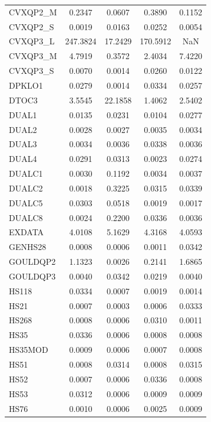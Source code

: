 \begin{longtable}{lcccc}
CVXQP2\_M &   0.2347 &   0.0607 &   0.3890 &   0.1152 \\
CVXQP2\_S &   0.0019 &   0.0163 &   0.0252 &   0.0054 \\
CVXQP3\_L & 247.3824 &  17.2429 & 170.5912 &      NaN \\
CVXQP3\_M &   4.7919 &   0.3572 &   2.4034 &   7.4220 \\
CVXQP3\_S &   0.0070 &   0.0014 &   0.0260 &   0.0122 \\
DPKLO1   &   0.0279 &   0.0014 &   0.0334 &   0.0257 \\
DTOC3    &   3.5545 &  22.1858 &   1.4062 &   2.5402 \\
DUAL1    &   0.0135 &   0.0231 &   0.0104 &   0.0277 \\
DUAL2    &   0.0028 &   0.0027 &   0.0035 &   0.0034 \\
DUAL3    &   0.0034 &   0.0036 &   0.0338 &   0.0036 \\
DUAL4    &   0.0291 &   0.0313 &   0.0023 &   0.0274 \\
DUALC1   &   0.0030 &   0.1192 &   0.0034 &   0.0037 \\
DUALC2   &   0.0018 &   0.3225 &   0.0315 &   0.0339 \\
DUALC5   &   0.0303 &   0.0518 &   0.0019 &   0.0017 \\
DUALC8   &   0.0024 &   0.2200 &   0.0336 &   0.0036 \\
EXDATA   &   4.0108 &   5.1629 &   4.3168 &   4.0593 \\
GENHS28  &   0.0008 &   0.0006 &   0.0011 &   0.0342 \\
GOULDQP2 &   1.1323 &   0.0026 &   0.2141 &   1.6865 \\
GOULDQP3 &   0.0040 &   0.0342 &   0.0219 &   0.0040 \\
HS118    &   0.0334 &   0.0007 &   0.0019 &   0.0014 \\
HS21     &   0.0007 &   0.0003 &   0.0006 &   0.0333 \\
HS268    &   0.0008 &   0.0006 &   0.0310 &   0.0011 \\
HS35     &   0.0336 &   0.0006 &   0.0008 &   0.0008 \\
HS35MOD  &   0.0009 &   0.0006 &   0.0007 &   0.0008 \\
HS51     &   0.0008 &   0.0314 &   0.0008 &   0.0315 \\
HS52     &   0.0007 &   0.0006 &   0.0336 &   0.0008 \\
HS53     &   0.0312 &   0.0006 &   0.0009 &   0.0009 \\
HS76     &   0.0010 &   0.0006 &   0.0025 &   0.0009 \\

\end{longtable}
